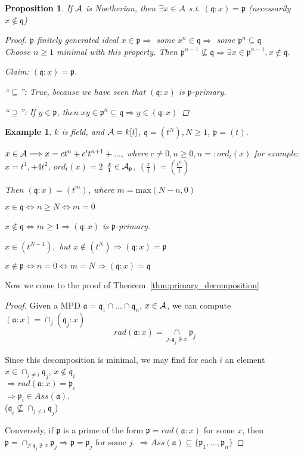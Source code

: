 \documentclass[11pt]{article}
\newtheorem{prop}[thm]{Proposition}
\newtheorem{ex}[thm]{Example}
\newcommand{\sca}{{\mathfrak a}}
\newcommand{\scp}{{\mathfrak p}}
\newcommand{\scq}{\mathfrak q}
\newcommand{\cala}{{\cal A}}
\newcommand{\Lrta}{\Longrightarrow}
\newcommand{\Llrta}{\Longleftrightarrow}
\begin{document}
\begin{prop}
If $\cala$ is Noetherian, then $\exists x\in\cala$ s.t. $(\scq:x)=\scp$ (necessarily $x\notin \scq$)
\begin{proof}
$\scp$ finitely generated ideal $x\in\scp\Lrta$ some $x^n\in\scq\Lrta $ some $\scp^n\subseteq \scq$ \\
Choose $n\geq 1$ minimal with this property. Then $\scp^{n-1}\not\subseteq\scq\Lrta \exists x\in\scp^{n-1},x\notin\scq$.

Claim: $(\scq:x)=\scp$.

``$\subseteq$'': True, because we have seen that $(\scq:x)$ is $\scp$-primary.

``$\supseteq$'': If $y\in\scp$, then $xy\in\scp^n\subseteq \scq\Lrta y\in(\scq:x)$
\end{proof}
\end{prop}

\begin{ex}
$k$ is field, and $\cala=k[t]$, $\scq=(t^N),N\geq 1$, $\scp=(t)$.

$x\in\cala\Lrta x=c t^n+c' t^{n+1}+...,$ where $c\neq 0, n\geq 0, n=:ord_t(x)$
for example: $x=t^4,+4t^2$, $ord_t(x)=2$
$\frac{x}{1}\in\cala_\scp$, $\left(\frac{x}{1}\right)=\left(\frac{t^n}{1}\right)$

Then $(\scq:x)=(t^m)$, where $m=\text{max}(N-n,0)$

$x\in\scq\Llrta n\geq N\Llrta m=0$

$x\notin\scq\Llrta m\geq 1\Lrta (\scq:x)$ is $\scp$-primary.

$x\in(t^{N-1}),$ but $x\notin(t^N)\Lrta(\scq:x)=\scp$

$x\notin\scp\Llrta n=0\Llrta m=N\Lrta (\scq:x)=\scq$
\end{ex}

Now we come to the proof of Theorem~\ref{thm:primary_decomposition}
\begin{proof}
Given a MPD $\sca=\scq_1\cap...\cap\scq_n$, $x\in\cala$, we can compute $(\sca:x)=\cap_{j}(\scq_j:x)$
$$
rad(\sca:x)=\underset{j:\scq_j\not\ni x}{\cap}\scp_j
$$

Since this decomposition is minimal, we may find for each $i$ an element $x\in\cap_{j\neq i}\scq_j$, $x\notin\scq_i$\\
$\Lrta rad(\sca:x)=\scp_i$\\
$\Lrta \scp_i\in Ass(\sca)$.\\ ($\scq_i\not \subseteq \cap_{j\neq i}\scq_j$) 

Conversely, if $\scp$ is a prime of the form $\scp=rad(\sca:x)$ for some $x$, then $\scp=\cap_{j:\scq_j\not\ni x}\scp_j\Lrta \scp=\scp_j$ for some $j$. $\Lrta Ass(\sca)\subseteq \{\scp_1,...,\scp_n\}$
\end{proof}
\end{document}
